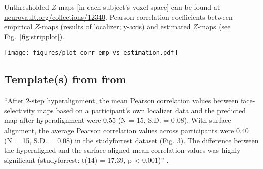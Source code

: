 



Unthresholded $Z$-maps [in each subject's voxel space] can be found at
\href{https://identifiers.org/neurovault.collection:12340}{\url{neurovault.org/collections/12340}}.
%
Pearson correlation coefficients between empirical $Z$-maps (results of
localizer; y-axis) and estimated $Z$-maps (see Fig.~\ref{fig:stripplot}).



\begin{figure*}[tbp] \centering
    \texttt{[image: figures/plot\_corr-emp-vs-estimation.pdf]}
    \caption{
    \textbf{Correlations between empirical and predicted
    \textit{\textbf{Z}}-maps.}
    Grey dots: A left-out subject's $Z$-map was estimated by projecting all
    other subjects ($N = 13$) $Z$-maps through the MNI152 space into the
    left-out subject space and averaging values across subject; correlations
    between empirical values from the localizer \& the predicted values using
    anatomical alignment.
    Green dots: estimation from visual localizer.
    Blue dots: transformation matrices computed based on an increasing number of
    segments of the audio-description; correlations between empirical values \&
    the predicted values using parts of the audio-description.
    Red dots: transformation matrices computed based on an increasing number of
    segments of the movie; correlations between empirical values \& the
    predicted values using parts of the movie.
}
\label{fig:stripplot}
\end{figure*}


\subsection{Template(s) from from \citet{jiahui2020predicting}}

%
``After 2-step hyperalignment, the mean Pearson correlation values between
face-selectivity maps based on a participant's own localizer data and the
predicted map after hyperalignment were 0.55 (N = 15, S.D. = 0.08).
%
With surface alignment, the average Pearson correlation values across
participants were 0.40 (N = 15, S.D. = 0.08) in the studyforrest dataset (Fig.
3).
%
The difference between the hyperaligned and the surface-aligned mean correlation
values was highly significant (studyforrest: t(14) = 17.39, p < 0.001)''
\citep{jiahui2020predicting}.



